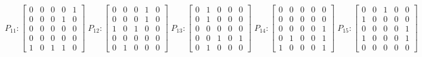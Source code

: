     $$
        P_{11} : \begin{bmatrix}
            0 & 0 & 0 & 0 & 1 \\
            0 & 0 & 0 & 1 & 0 \\
            0 & 0 & 0 & 0 & 0 \\
            0 & 0 & 0 & 0 & 0 \\
            1 & 0 & 1 & 1 & 0
        \end{bmatrix}
        \;
        P_{12} : \begin{bmatrix}
            0 & 0 & 0 & 1 & 0 \\
            0 & 0 & 0 & 1 & 0 \\
            1 & 0 & 1 & 0 & 0 \\
            0 & 0 & 0 & 0 & 0 \\
            0 & 1 & 0 & 0 & 0
        \end{bmatrix}
        \;  
        P_{13} : \begin{bmatrix}
            0 & 1 & 0 & 0 & 0 \\
            0 & 1 & 0 & 0 & 0 \\
            0 & 0 & 0 & 0 & 0 \\
            0 & 0 & 1 & 0 & 1 \\
            0 & 1 & 0 & 0 & 0
        \end{bmatrix}
        \;
        P_{14} : \begin{bmatrix}
            0 & 0 & 0 & 0 & 0 \\
            0 & 0 & 0 & 0 & 0 \\
            0 & 0 & 0 & 0 & 1 \\
            0 & 1 & 0 & 0 & 1 \\
            1 & 0 & 0 & 0 & 1
        \end{bmatrix}
        \;
        P_{15} : \begin{bmatrix}
            0 & 0 & 1 & 0 & 0 \\
            1 & 0 & 0 & 0 & 0 \\
            0 & 0 & 0 & 0 & 1 \\
            1 & 0 & 0 & 0 & 1 \\
            0 & 0 & 0 & 0 & 0
        \end{bmatrix}
    $$

